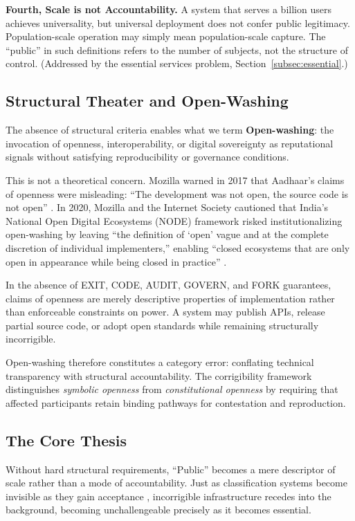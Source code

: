 \documentclass{article}
\begin{document}
\textbf{Fourth, Scale is not Accountability.} A system that serves a billion users achieves universality, but universal deployment does not confer public legitimacy. Population-scale operation may simply mean population-scale capture. The ``public'' in such definitions refers to the number of subjects, not the structure of control. (Addressed by the essential services problem, Section~\ref{subsec:essential}.)

\subsection{Structural Theater and Open-Washing}
\label{subsec:openwashing-intro}

The absence of structural criteria enables what we term \textbf{Open-washing}: the invocation of openness, interoperability, or digital sovereignty as reputational signals without satisfying reproducibility or governance conditions.

This is not a theoretical concern. Mozilla warned in 2017 that Aadhaar's claims of openness were misleading: ``The development was not open, the source code is not open'' \citep{mozilla2017}. In 2020, Mozilla and the Internet Society cautioned that India's National Open Digital Ecosystems (NODE) framework risked institutionalizing open-washing by leaving ``the definition of `open' vague and at the complete discretion of individual implementers,'' enabling ``closed ecosystems that are only open in appearance while being closed in practice'' \citep{mozilla2020}.

In the absence of EXIT, CODE, AUDIT, GOVERN, and FORK guarantees, claims of openness are merely descriptive properties of implementation rather than enforceable constraints on power. A system may publish APIs, release partial source code, or adopt open standards while remaining structurally incorrigible.

Open-washing therefore constitutes a category error: conflating technical transparency with structural accountability. The corrigibility framework distinguishes \textit{symbolic openness} from \textit{constitutional openness} by requiring that affected participants retain binding pathways for contestation and reproduction.

\subsection{The Core Thesis}

Without hard structural requirements, ``Public'' becomes a mere descriptor of scale rather than a mode of accountability. Just as classification systems become invisible as they gain acceptance \citep{bowker1999}, incorrigible infrastructure recedes into the background, becoming unchallengeable precisely as it becomes essential.
\end{document}
